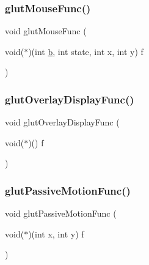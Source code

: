 \subsubsection{\texorpdfstring{glut\+Mouse\+Func()}{glutMouseFunc()}}
{\footnotesize\ttfamily void glut\+Mouse\+Func (\begin{DoxyParamCaption}\item[{void($\ast$)(int \hyperlink{forms_8_h_a0ba06a290a384fa06b1b90745827dae2}{b}, int state, int x, int y)}]{f }\end{DoxyParamCaption})\hspace{0.3cm}{\ttfamily [inline]}}

\mbox{\label{glut_8_h_abf8893d8fedddcda84472a08a2f754cd}} 
\subsubsection{\texorpdfstring{glut\+Overlay\+Display\+Func()}{glutOverlayDisplayFunc()}}
{\footnotesize\ttfamily void glut\+Overlay\+Display\+Func (\begin{DoxyParamCaption}\item[{void($\ast$)()}]{f }\end{DoxyParamCaption})\hspace{0.3cm}{\ttfamily [inline]}}

\mbox{\label{glut_8_h_aad86fcc99dc0136c75068fe712207de1}} 
\subsubsection{\texorpdfstring{glut\+Passive\+Motion\+Func()}{glutPassiveMotionFunc()}}
{\footnotesize\ttfamily void glut\+Passive\+Motion\+Func (\begin{DoxyParamCaption}\item[{void($\ast$)(int x, int y)}]{f }\end{DoxyParamCaption})\hspace{0.3cm}{\ttfamily [inline]}}

\mbox{\label{glut_8_h_ae18a2016bd881cba7809036b60ed13e0}} 
